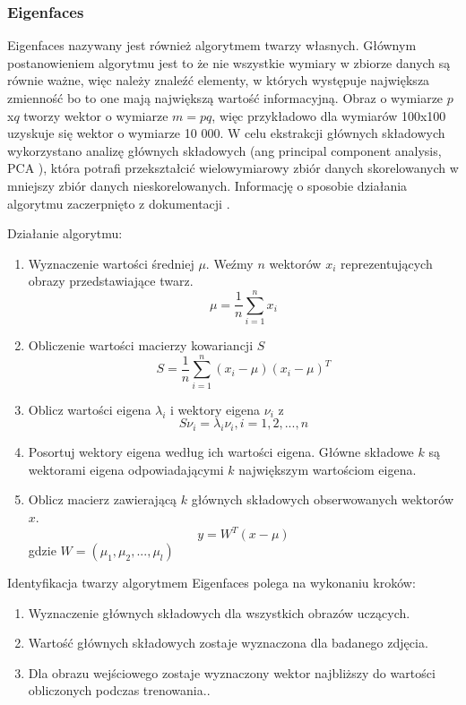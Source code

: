 \subsubsection{Eigenfaces} \label{s:eigen}
Eigenfaces \cite{opencv_doc} nazywany jest również algorytmem twarzy własnych. Głównym postanowieniem algorytmu jest to że nie wszystkie wymiary w zbiorze danych są równie ważne, więc należy znaleźć elementy, w których występuje największa zmienność bo to one mają największą wartość informacyjną. Obraz o wymiarze $p$x$q$ tworzy wektor o wymiarze $m=pq$, więc przykładowo dla wymiarów 100x100 uzyskuje się wektor o wymiarze 10 000. W celu ekstrakcji głównych składowych wykorzystano analizę głównych składowych (ang principal component analysis, PCA \cite{pca_lda}), która potrafi przekształcić wielowymiarowy zbiór danych skorelowanych w mniejszy zbiór danych nieskorelowanych. Informację o sposobie działania algorytmu zaczerpnięto z dokumentacji \cite{opencv_doc}.

Działanie algorytmu:
\begin{enumerate}
\item Wyznaczenie wartości średniej $\mu$. Weźmy $n$ wektorów $x_{i}$ reprezentujących obrazy przedstawiające twarz.
\begin{equation}
\mu=\frac{1}{n}\sum_{i=1}^{n}x_{i}
\end{equation}
\item Obliczenie wartości macierzy kowariancji $S$
\begin{equation}
S=\frac{1}{n}\sum^{n}_{i=1}(x_{i}-\mu)(x_{i}-\mu)^{T}
\end{equation}
\item Oblicz wartości eigena $\lambda_{i}$ i wektory eigena $\nu_{i}$ z \begin{equation}
S\nu_{i}=\lambda_{i}\nu_{i},i=1,2,...,n
\end{equation}
\item Posortuj wektory eigena według ich wartości eigena. Główne składowe $k$ są wektorami eigena odpowiadającymi $k$ największym wartościom eigena.
\item Oblicz macierz zawierającą $k$ głównych składowych obserwowanych wektorów $x$.
\begin{equation}
y=W^{T}(x-\mu)
\end{equation}
gdzie $W=(\mu_{1},\mu_{2},...,\mu_{l})$
\end{enumerate}

Identyfikacja twarzy algorytmem Eigenfaces polega na wykonaniu kroków:
\begin{enumerate}
\item Wyznaczenie głównych składowych dla wszystkich obrazów uczących.
\item Wartość głównych składowych zostaje wyznaczona dla badanego zdjęcia.
\item Dla obrazu wejściowego zostaje wyznaczony wektor najbliższy do wartości obliczonych podczas trenowania..
\end{enumerate}

